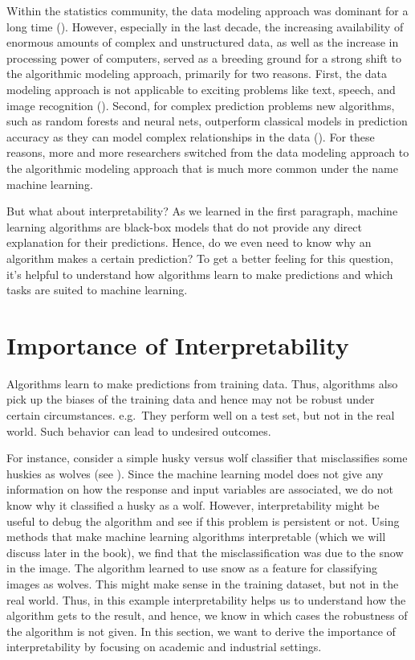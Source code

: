 \documentclass[]{krantz}
\begin{document}
Within the statistics community, the data modeling approach was dominant
for a long time (\citet{breiman2001}). However, especially in the last
decade, the increasing availability of enormous amounts of complex and
unstructured data, as well as the increase in processing power of
computers, served as a breeding ground for a strong shift to the
algorithmic modeling approach, primarily for two reasons. First, the
data modeling approach is not applicable to exciting problems like text,
speech, and image recognition (\citet{breiman2001}). Second, for complex
prediction problems new algorithms, such as random forests and neural
nets, outperform classical models in prediction accuracy as they can
model complex relationships in the data (\citet{breiman2001}). For these
reasons, more and more researchers switched from the data modeling
approach to the algorithmic modeling approach that is much more common
under the name machine learning.

But what about interpretability? As we learned in the first paragraph,
machine learning algorithms are black-box models that do not provide any
direct explanation for their predictions. Hence, do we even need to know
why an algorithm makes a certain prediction? To get a better feeling for
this question, it's helpful to understand how algorithms learn to make
predictions and which tasks are suited to machine learning.

\section{Importance of
Interpretability}\label{importance-of-interpretability}

Algorithms learn to make predictions from training data. Thus,
algorithms also pick up the biases of the training data and hence may
not be robust under certain circumstances. e.g.~They perform well on a
test set, but not in the real world. Such behavior can lead to undesired
outcomes.

For instance, consider a simple husky versus wolf classifier that
misclassifies some huskies as wolves (see \citet{ribeiro2016should}).
Since the machine learning model does not give any information on how
the response and input variables are associated, we do not know why it
classified a husky as a wolf. However, interpretability might be useful
to debug the algorithm and see if this problem is persistent or not.
Using methods that make machine learning algorithms interpretable (which
we will discuss later in the book), we find that the misclassification
was due to the snow in the image. The algorithm learned to use snow as a
feature for classifying images as wolves. This might make sense in the
training dataset, but not in the real world. Thus, in this example
interpretability helps us to understand how the algorithm gets to the
result, and hence, we know in which cases the robustness of the
algorithm is not given. In this section, we want to derive the
importance of interpretability by focusing on academic and industrial
settings.
\end{document}
